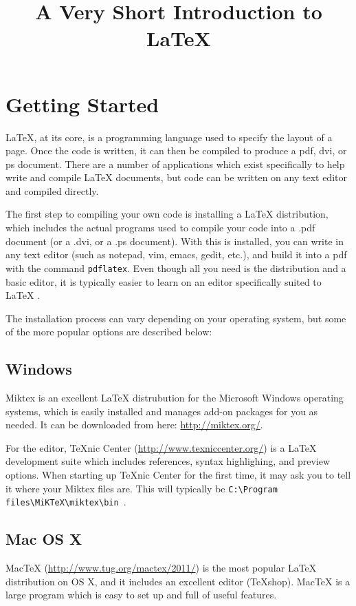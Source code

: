 \documentclass[11pt]{article}
\newcommand{\Lt}{\LaTeX{} } \newcommand{\bs}{\textbackslash}
\begin{document}
\title{A Very Short Introduction to \Lt} 
\date{}       %
\author{}     %
\maketitle
\thispagestyle{fancy} %

\section*{Getting Started}  %
  \LaTeX{}, at its core, is a programming language used to specify the layout of
  a page. Once the code is written, it can then be compiled to produce a pdf,
  dvi, or ps document. There are a number of applications which exist
  specifically to help write and compile \Lt documents, but code can be written
  on any text editor and compiled directly. 
  
  The first step to compiling your own code is installing a \Lt distribution,
  which includes the actual programs used to compile your code into a .pdf
  document (or a .dvi, or a .ps document).  With this is installed, you can
  write in any text editor (such as notepad, vim, emacs, gedit, etc.), and build
  it into a pdf with the command \verb+pdflatex+. Even though all you need is
  the distribution and a basic editor, it is typically easier to learn on an
  editor specifically suited to \Lt.
  
  The installation process can vary depending on your operating system, but
  some of the more popular options are described below:

  \subsection*{Windows} 
    Miktex is an excellent \Lt distrubution for the
    Microsoft Windows operating systems, which is easily installed and manages
    add-on packages for you as needed. It can be downloaded from here:
    \url{http://miktex.org/}.

    For the editor, TeXnic Center (\url{http://www.texniccenter.org/}) is a \Lt
    development suite which includes references, syntax highlighing, and
    preview options.  When starting up TeXnic Center for the first time, it may
    ask you to tell it where your Miktex files are. This will typically be
    \verb+C:\Program files\MiKTeX\miktex\bin +.

  \subsection*{Mac OS X} 
    MacTeX (\url{http://www.tug.org/mactex/2011/}) is the
    most popular \Lt distribution on OS X, and it includes an excellent editor
    (TeXshop). MacTeX is a large program which is easy to set up and full of
    useful features.
\end{document}
